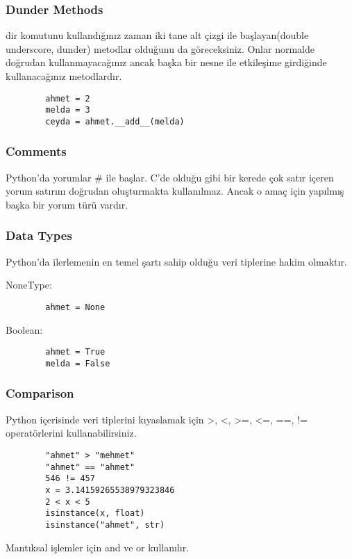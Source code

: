 \documentclass[10pt, compress]{beamer}
\begin{document}
\begin{frame}[fragile]
\frametitle{Dunder Methods}    
    \alert{dir} komutunu kullandığınız zaman iki tane alt çizgi ile başlayan(double underscore, dunder) metodlar olduğunu da göreceksiniz. Onlar normalde doğrudan kullanmayacağınız ancak başka bir nesne ile etkileşime girdiğinde kullanacağınız metodlardır.
    \begin{verbatim}
        ahmet = 2
        melda = 3
        ceyda = ahmet.__add__(melda)
    \end{verbatim}
\end{frame}

\begin{frame}[fragile]
\frametitle{Comments}    
    Python'da yorumlar \alert{\#} ile başlar. C'de olduğu gibi bir kerede çok satır içeren yorum satırını doğrudan oluşturmakta kullanılmaz. Ancak o amaç için yapılmış başka bir yorum türü vardır.
\end{frame}

\begin{frame}[fragile]
\frametitle{Data Types}    
    Python'da ilerlemenin en temel şartı sahip olduğu veri tiplerine hakim olmaktır.
    
    NoneType:
    \begin{verbatim}
        ahmet = None
    \end{verbatim}  
    
    Boolean:
    \begin{verbatim}
        ahmet = True
        melda = False
    \end{verbatim}     
\end{frame}

\begin{frame}[fragile]
\frametitle{Comparison}    
    Python içerisinde veri tiplerini kıyaslamak için \alert{>, <, >=, <=, ==, !=} operatörlerini kullanabilirsiniz.

    \begin{verbatim}
        "ahmet" > "mehmet"
        "ahmet" == "ahmet"
        546 != 457
        x = 3.14159265538979323846
        2 < x < 5
        isinstance(x, float)
        isinstance("ahmet", str)
    \end{verbatim}     
    
    Mantıksal işlemler için \alert{and} ve \alert{or} kullanılır.
    
\end{frame}
\end{document}
